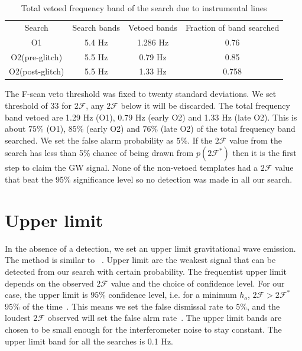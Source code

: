 \documentclass{ttuthes2007}
\begin{document}
\begin{table} 
\begin{tabular}{cccc} 
  \textrm{Search} & \textrm{Search bands} & \textrm{Vetoed bands} & \textrm{Fraction of band searched}\\   
\ac{O1} & 5.4 Hz & 1.286 Hz & 0.76\\ 
\ac{O2}(pre-glitch)& 5.5 Hz  & 0.79 Hz & 0.85\\ 
\ac{O2}(post-glitch) & 5.5 Hz & 1.33 Hz & 0.758\\  
\end{tabular} 
\caption{Total vetoed frequency band of the search due to instrumental
lines}\label{table:veto} 
\end{table} 
 
The F-scan veto threshold was fixed to twenty standard
deviations.  We set threshold of 33 for $2\mathcal{F}$, any $2\mathcal{F}$ below
it will be discarded.  The total frequency band vetoed are 1.29 Hz (O1), 0.79 Hz
(early O2) and 1.33 Hz (late O2). This is about $75\%$ (O1), $85\%$ (early O2)
and $76\%$ (late O2) of the total frequency band searched. We set the false
alarm probability as $5\%$. If the $2\mathcal{F}$
value from the search has less than 5\% chance of being drawn from
$p(2\mathcal{F}^*)$ then it is the first step to claim the \ac{GW} signal. None
of the non-vetoed templates had a $2\mathcal{F}$ value that beat the 95\%
significance level so no detection was made in all our search.

\section{Upper limit}
In the absence of a detection, we set an upper limit gravitational wave
emission. The method is similar to ~\citet{Lindblom_2020}. Upper limit are the
weakest signal that can be detected from our search with certain probability.
The frequentist upper limit depends on the observed $2\mathcal{F}$ value and the
choice of confidence level. For our case, the upper limit is $95\%$ confidence
level, i.e. for a minimum $h_o$, $2\mathcal{F} > 2\mathcal{F}^*$ $95\%$ of the
time~\cite{Romano_2017}. This means we set the false dismissal rate to $5\%$,
and the loudest $2\mathcal{F}$ observed will set the false alrm
rate~\cite{Aasi_2015}. The upper limit bands are chosen to be small enough for
the interferometer noise to stay constant. The upper limit band for all the
searches is 0.1 Hz. 
\end{document}
